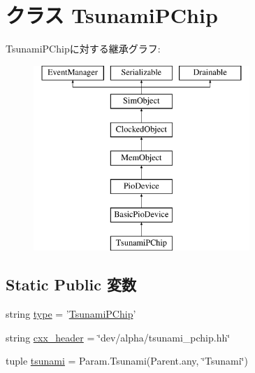\hypertarget{classTsunami_1_1TsunamiPChip}{
\section{クラス TsunamiPChip}
\label{classTsunami_1_1TsunamiPChip}
}
TsunamiPChipに対する継承グラフ:\begin{figure}[H]
\begin{center}
\leavevmode
\includegraphics[height=7cm]{classTsunami_1_1TsunamiPChip}
\end{center}
\end{figure}
\subsection*{Static Public 変数}
\begin{DoxyCompactItemize}
\item 
string \hyperlink{classTsunami_1_1TsunamiPChip_acce15679d830831b0bbe8ebc2a60b2ca}{type} = '\hyperlink{classTsunami_1_1TsunamiPChip}{TsunamiPChip}'
\item 
string \hyperlink{classTsunami_1_1TsunamiPChip_a17da7064bc5c518791f0c891eff05fda}{cxx\_\-header} = \char`\"{}dev/alpha/tsunami\_\-pchip.hh\char`\"{}
\item 
tuple \hyperlink{classTsunami_1_1TsunamiPChip_aabfaa1eda1546a625690c7a59b7fed04}{tsunami} = Param.Tsunami(Parent.any, \char`\"{}Tsunami\char`\"{})
\end{DoxyCompactItemize}


